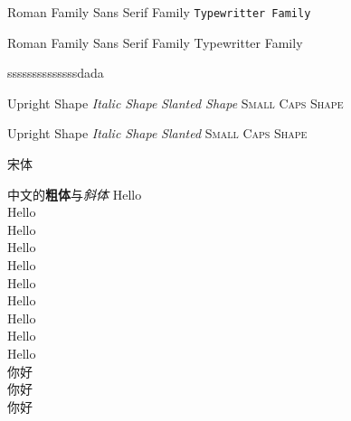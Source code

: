 \documentclass{article}
\newcommand{\myfont}{\heiti\zihao{4}}
\begin{document}
	\textrm{Roman Family} \textsf{Sans Serif Family} \texttt{Typewritter Family}
	
	{\rmfamily Roman Family} {\sffamily Sans Serif Family} {\ttfamily Typewritter Family}
	
	{\rmfamily ssssssssssssssdada}
	
	\textup{Upright Shape} \textit{Italic Shape}
	\textsl{Slanted Shape} \textsc{Small Caps Shape}
	
	{\upshape Upright Shape} {\itshape Italic Shape}
	{\slshape Slanted} {\scshape Small Caps Shape}
	
	{\songti 宋体}
	
	中文的\textbf{粗体}与\textit{斜体}
	{\tiny Hello}\\
	{\scriptsize Hello}\\
	{\footnotesize Hello}\\
	{\small Hello}\\
	{\normalsize Hello}\\
	{\large Hello}\\
	{\Large Hello}\\
	{\LARGE Hello}\\
	{\huge Hello}\\
	{\Huge Hello}\\
	你好 \\%
	你好\\ %
	\myfont 你好 
	
\end{document}
